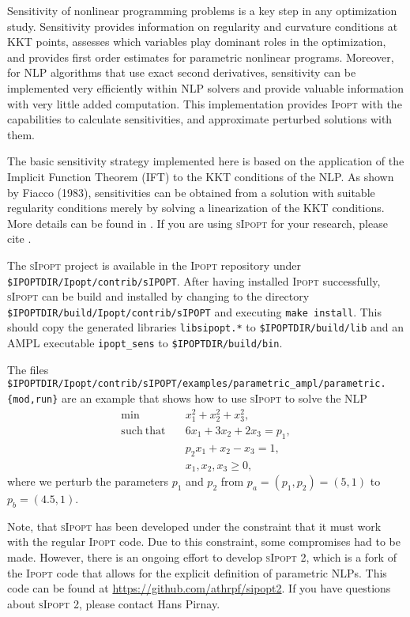 \documentclass[10pt]{article}
\newcommand{\Ipopt}{\textsc{Ipopt}\xspace}
\newcommand{\sIpopt}{\textsc{sIpopt}\xspace}
\begin{document}
Sensitivity of nonlinear programming problems is a key step in any optimization study. Sensitivity provides information on regularity and curvature conditions at KKT points, assesses which variables play dominant roles in the optimization, and provides first order estimates for parametric nonlinear programs. Moreover, for NLP algorithms that use exact second derivatives, sensitivity can be implemented very efficiently within NLP solvers and provide valuable information with very little added computation. This implementation provides \Ipopt with the capabilities to calculate sensitivities, and approximate perturbed solutions with them.

The basic sensitivity strategy implemented here is based on the application of the Implicit Function Theorem (IFT) to the KKT conditions of the NLP. As shown by Fiacco (1983), sensitivities can be obtained from a solution with suitable regularity conditions merely by solving a linearization of the KKT conditions. More details can be found in \cite{PLNB:sIpopt}.
If you are using \sIpopt for your research, please cite \cite{PLNB:sIpopt}.

The \sIpopt project is available in the \Ipopt repository under
{\tt \$IPOPTDIR/Ipopt/contrib/sIPOPT}.
After having installed \Ipopt successfully, \sIpopt can be build and installed by changing to the directory {\tt \$IPOPTDIR/build/Ipopt/contrib/sIPOPT} and executing {\tt make install}. 
This should copy the generated libraries {\tt libsipopt.*} to {\tt \$IPOPTDIR/build/lib} and an AMPL executable {\tt ipopt\_sens} to {\tt \$IPOPTDIR/build/bin}.

The files {\tt \$IPOPTDIR/Ipopt/contrib/sIPOPT/examples/parametric\_ampl/parametric.\{mod,run\}} are an example that shows how to use \sIpopt to solve the NLP
\begin{align}
\min\quad & x_1^2 + x_2^2 + x_3^2, \\
\mathrm{such~that}\quad & 6x_1 + 3x_2 + 2x_3 = p_1, \\
 & p_2 x_1 + x_2 - x_3  = 1, \\
 & x_1, x_2, x_3 \geq 0,
\end{align}
where we perturb the parameters $p_1$ and $p_2$ from $p_a = (p_1, p_2) = (5, 1)$ to $p_b = (4.5, 1)$.


Note, that \sIpopt has been developed under the constraint that it must work with the regular \Ipopt code. Due to this constraint, some compromises had to be made.
However, there is an ongoing effort to develop \sIpopt 2, which is a fork of the \Ipopt code that allows for the explicit definition of parametric NLPs. This code can be found at \url{https://github.com/athrpf/sipopt2}. If you have questions about \sIpopt 2, please contact ​Hans Pirnay.
\end{document}
